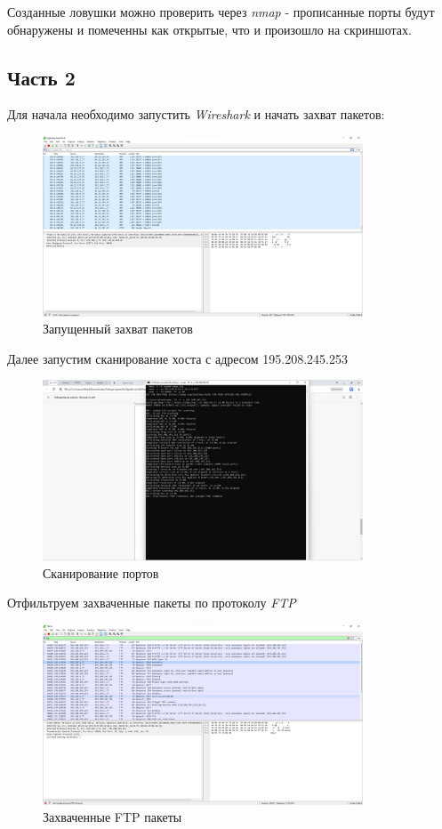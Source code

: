 \documentclass[a4paper]{article}
\begin{document}
  Созданные ловушки можно проверить через \textit{nmap} - прописанные порты будут обнаружены
  и помеченны как открытые, что и произошло на скриншотах.

  \subsection{Часть 2}

  Для начала необходимо запустить \textit{Wireshark} и начать захват пакетов:
  \begin{figure}[H]
    \centering
    \includegraphics[width=0.85\textwidth]{01_00 (46)}
    \caption{Запущенный захват пакетов}
  \end{figure}

  Далее запустим сканирование хоста с адресом 195.208.245.253
  \begin{figure}[H]
    \centering
    \includegraphics[width=0.85\textwidth]{01_00 (47)}
    \caption{Сканирование портов}
  \end{figure}

  Отфильтруем захваченные пакеты по протоколу \textit{FTP}
  \begin{figure}[H]
    \centering 
    \includegraphics[width=0.85\textwidth]{01_00 (48)}
    \caption{Захваченные FTP пакеты}
  \end{figure}
\end{document}
